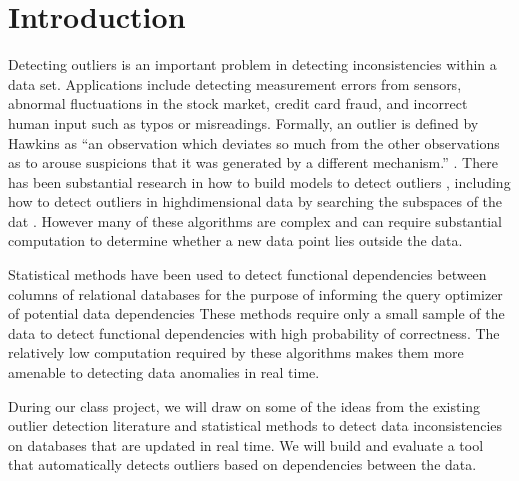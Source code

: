\documentclass{vldb}
\begin{document}
\section{Introduction}
Detecting outliers is an important problem in detecting inconsistencies within a data set.
Applications include detecting measurement errors from sensors, abnormal fluctuations in the stock market, credit card fraud, and incorrect human input such as typos or misreadings.
Formally, an outlier is defined by Hawkins as “an observation which deviates so much from the other observations as to arouse suspicions that it was generated by a different mechanism.” \cite{Hawkins1980}.
There has been substantial research in how to build models to detect outliers \cite{Aggarwal2013}, including how to detect outliers in high­dimensional data by searching the subspaces of the dat \cite{Zhang2004}\cite{Kriegel2009}.
However many of these algorithms are complex and can require substantial computation to determine whether a new data point lies outside the data.

Statistical methods have been used to detect functional dependencies between columns of relational databases for the purpose of informing the query optimizer of potential data dependencies \cite{Ilyas2004} 
These methods require only a small sample of the data to detect functional dependencies with high probability of correctness.
The relatively low computation required by these algorithms makes them more amenable to detecting data anomalies in real time.

During our class project, we will draw on some of the ideas from the existing outlier detection literature and statistical methods to detect data inconsistencies on databases that are updated in real time.
We will build and evaluate a tool that automatically detects outliers based on dependencies between the data.

\section{}

\subsection{}

\subsubsection{}







\end{document}
